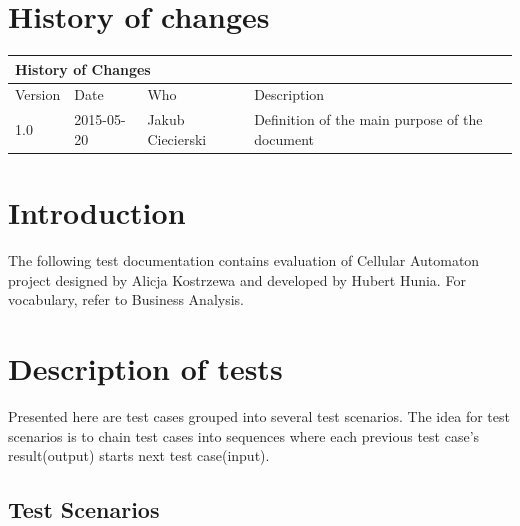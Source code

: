 \documentclass{article}
\begin{document}
\section{History of changes}

	\begin{table}[h]
		\hspace*{-2.1cm}
		\large
		\begin{tabular}{|l|l|l|l|}
		\hline
		\multicolumn{4}{|l|}{\cellcolor[HTML]{C0C0C0}History of Changes} \\ \hline
		Version         & Date         & Who        & Description        \\ \hline
		1.0         & 2015-05-20         & Jakub Ciecierski        & Definition of the main purpose of the document       \\ \hline
		\end{tabular}
	\end{table}





\newpage




\section{Introduction}
The following test documentation contains evaluation of Cellular Automaton project
designed by Alicja Kostrzewa and developed by Hubert Hunia.
For vocabulary, refer to Business Analysis.
	
\section{Description of tests}
Presented here are test cases grouped into several test scenarios.
The idea for test scenarios is to chain test cases into sequences
where each previous test case's result(output) starts next test case(input).

\subsection{Test Scenarios}
\end{document}
